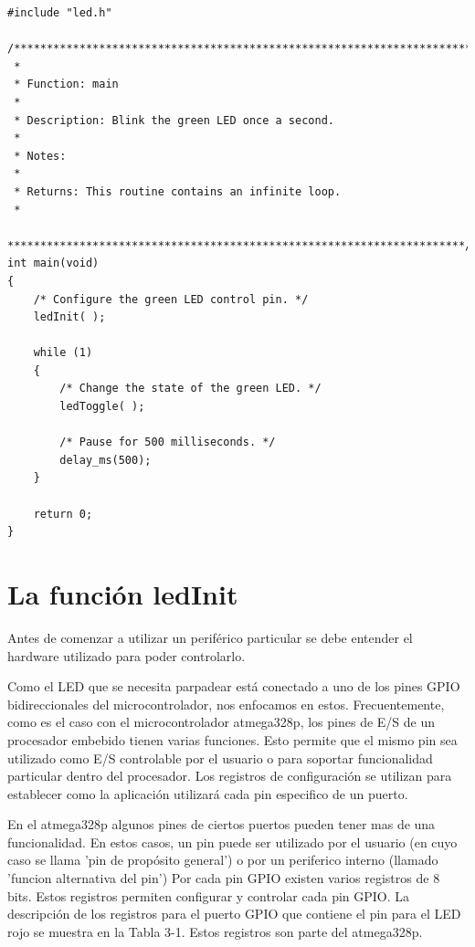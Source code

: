 \documentclass[12pt]{article}
\begin{document}
\begin{verbatim}
#include "led.h"

/**********************************************************************
 *
 * Function: main
 *
 * Description: Blink the green LED once a second.
 *
 * Notes:
 *
 * Returns: This routine contains an infinite loop.
 *
 **********************************************************************/
int main(void)
{
    /* Configure the green LED control pin. */
    ledInit( );

    while (1)
    {
        /* Change the state of the green LED. */
        ledToggle( );

        /* Pause for 500 milliseconds. */
        delay_ms(500);
    }

    return 0;
}
\end{verbatim}

\section *{La función ledInit}

Antes de comenzar a utilizar un periférico particular se debe entender el 
hardware utilizado para poder controlarlo.


Como el LED que se necesita parpadear está conectado a uno de los pines
GPIO bidireccionales del microcontrolador, nos enfocamos en estos.
Frecuentemente, como es el caso con el microcontrolador atmega328p, los
pines de E/S de un procesador embebido tienen varias funciones.
Esto permite que el mismo pin sea utilizado como E/S controlable por el usuario
o para soportar funcionalidad particular dentro del procesador.
Los registros de configuración se utilizan para establecer como la aplicación
utilizará cada pin especifico de un puerto.

En el atmega328p algunos pines de ciertos puertos pueden tener mas de 
una funcionalidad. En estos casos, un pin puede ser utilizado por el usuario
(en cuyo caso se llama 'pin de propósito general') o por un periferico interno (llamado 'funcion alternativa del pin')
Por cada pin GPIO 
existen varios registros de 8 bits. 
Estos registros permiten configurar y controlar cada pin GPIO.
La descripción de los registros para el puerto GPIO que contiene el pin
para el LED rojo se muestra en la Tabla 3-1. Estos registros son parte
del atmega328p.
\end{document}
